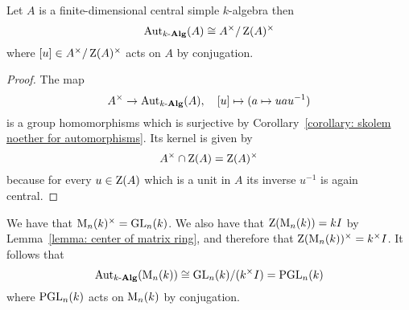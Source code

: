 \begin{corollary}
  Let $A$ is a finite-dimensional central simple $k$-algebra then
  \[
          \operatorname{Aut}_{k\text{-}\mathbf{Alg}}(A)
    \cong A^\times / \operatorname{Z}(A)^\times
  \]
  where $[u] \in A^\times / \operatorname{Z}(A)^\times$ acts on $A$ by conjugation.
\end{corollary}


\begin{proof}
  The map
  \[
            A^\times
    \to     \operatorname{Aut}_{k\text{-}\mathbf{Alg}}(A),
    \quad   [u]
    \mapsto (a \mapsto u a u^{-1})
  \]
  is a group homomorphisms which is surjective by Corollary~\ref{corollary: skolem noether for automorphisms}.
  Its kernel is given by
  \[
      A^\times \cap \operatorname{Z}(A)
    = \operatorname{Z}(A)^\times
  \]
  because for every $u \in \operatorname{Z}(A)$ which is a unit in $A$ its inverse $u^{-1}$ is again central.
\end{proof}


\begin{example}
  We have that $\operatorname{M}_n(k)^\times = \operatorname{GL}_n(k)$.
  We also have that $\operatorname{Z}(\operatorname{M}_n(k)) = k I$ by Lemma~\ref{lemma: center of matrix ring}, and therefore that $\operatorname{Z}(\operatorname{M}_n(k))^\times = k^\times I$.
  It follows that
  \[
          \operatorname{Aut}_{k\text{-}\mathbf{Alg}}(\operatorname{M}_n(k))
    \cong \operatorname{GL}_n(k) / (k^\times I)
    =     \operatorname{PGL}_n(k)
  \]
  where $\operatorname{PGL}_n(k)$ acts on $\operatorname{M}_n(k)$ by conjugation.
\end{example}




